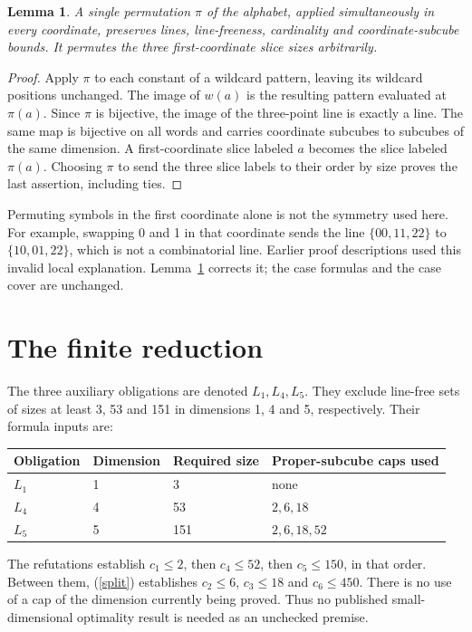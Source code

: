 \documentclass[11pt]{article}
\newtheorem{lemma}{Lemma}
\begin{document}
\begin{lemma}\label{sym}
A single permutation $\pi$ of the alphabet, applied simultaneously in every coordinate, preserves lines, line-freeness, cardinality and coordinate-subcube bounds. It permutes the three first-coordinate slice sizes arbitrarily.
\end{lemma}
\begin{proof}
Apply $\pi$ to each constant of a wildcard pattern, leaving its wildcard positions unchanged. The image of $w(a)$ is the resulting pattern evaluated at $\pi(a)$. Since $\pi$ is bijective, the image of the three-point line is exactly a line. The same map is bijective on all words and carries coordinate subcubes to subcubes of the same dimension. A first-coordinate slice labeled $a$ becomes the slice labeled $\pi(a)$. Choosing $\pi$ to send the three slice labels to their order by size proves the last assertion, including ties.
\end{proof}
Permuting symbols in the first coordinate alone is not the symmetry used here. For example, swapping 0 and 1 in that coordinate sends the line $\{00,11,22\}$ to $\{10,01,22\}$, which is not a combinatorial line. Earlier proof descriptions used this invalid local explanation. Lemma~\ref{sym} corrects it; the case formulas and the case cover are unchanged.

\section{The finite reduction}
The three auxiliary obligations are denoted $L_1,L_4,L_5$. They exclude line-free sets of sizes at least 3, 53 and 151 in dimensions 1, 4 and 5, respectively. Their formula inputs are:
\begin{center}
\begin{tabular}{llll}\toprule
Obligation & Dimension & Required size & Proper-subcube caps used\\\midrule
$L_1$ & 1 & 3 & none\\
$L_4$ & 4 & 53 & $2,6,18$\\
$L_5$ & 5 & 151 & $2,6,18,52$\\\bottomrule
\end{tabular}
\end{center}
The refutations establish $c_1\leq2$, then $c_4\leq52$, then $c_5\leq150$, in that order. Between them, (\ref{split}) establishes $c_2\leq6$, $c_3\leq18$ and $c_6\leq450$. There is no use of a cap of the dimension currently being proved. Thus no published small-dimensional optimality result is needed as an unchecked premise.
\end{document}
